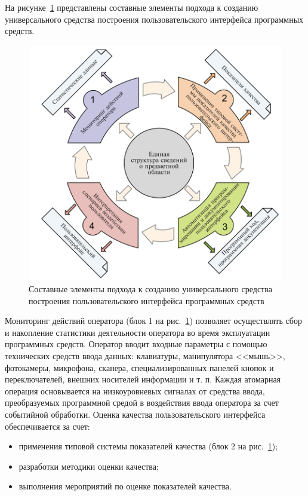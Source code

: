\def\notedate{2022.10.15}
\def\currentauthor{Василян А.Р. (РК6-73Б)}


На рисунке~\ref{rndhpcgui.2022.10.15.scheme1} представлены составные элементы подхода к созданию универсального средства построения пользовательского интерфейса программных средств.

\begin{figure}[!ht]
  \centering
  \includegraphics[scale=0.8]{ResearchNotes/rndhpc_int_gui_2022_10_15/scheme1.png}
  \caption{Составные элементы подхода к созданию универсального средства построения пользовательского интерфейса программных средств}
  \label{rndhpcgui.2022.10.15.scheme1}
\end{figure}

Мониторинг действий оператора (блок 1 на рис.~\ref{rndhpcgui.2022.10.15.scheme1}) позволяет осуществлять сбор и накопление статистики деятельности оператора во время эксплуатации программных средств. Оператор вводит входные параметры с помощью технических средств ввода данных: клавиатуры, манипулятора <<мышь>>, фотокамеры, микрофона, сканера, специализированных панелей кнопок и переключателей, внешних носителей информации и т. п. Каждая атомарная операция основывается на низкоуровневых сигналах от средства ввода, преобразуемых программной средой в воздействия ввода оператора за счет событийной обработки.
Оценка качества пользовательского интерфейса обеспечивается за счет:
\begin{itemize}
	\item применения типовой системы показателей качества (блок 2 на рис.~\ref{rndhpcgui.2022.10.15.scheme1});
	\item разработки методики оценки качества;
	\item выполнения мероприятий по оценке показателей качества.
\end{itemize}

